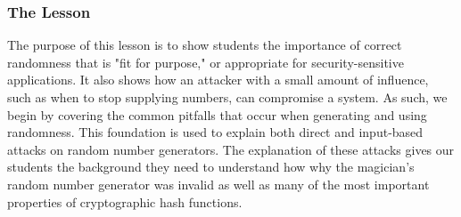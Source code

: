 %

\subsubsection{The Lesson}

The purpose of this lesson is to show students the importance of correct
randomness
that is "fit for purpose," or appropriate for security-sensitive applications.
It also shows how an attacker
with a small amount of influence,
such as when to stop supplying numbers,
can compromise a
system.
As such, we begin by covering the common pitfalls
that occur when generating and
using randomness.
This foundation is used to explain both
direct and input-based attacks on random
number generators.
The explanation of these attacks gives our students the background they need to
understand how why the magician's random number generator was invalid as well as
many of the most important properties of cryptographic hash functions.

